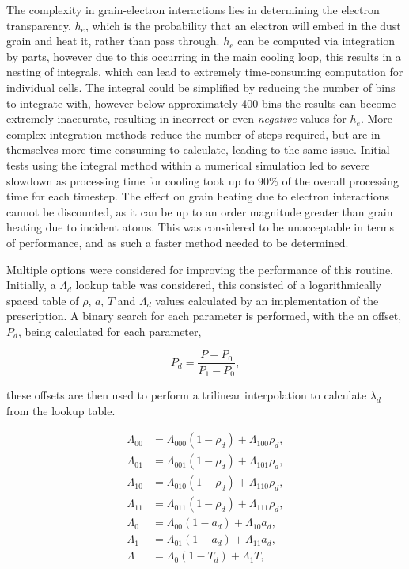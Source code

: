 The complexity in grain-electron interactions lies in determining the electron transparency, $h_e$, which is the probability that an electron will embed in the dust grain and heat it, rather than pass through.
$h_e$ can be computed via integration by parts, however due to this occurring in the main cooling loop, this results in a nesting of integrals, which can lead to extremely time-consuming computation for individual cells.
The integral could be simplified by reducing the number of bins to integrate with, however below approximately 400 bins the results can become extremely inaccurate, resulting in incorrect or even \textit{negative} values for $h_e$.
More complex integration methods reduce the number of steps required, but are in themselves more time consuming to calculate, leading to the same issue.
Initial tests using the integral method within a numerical simulation led to severe slowdown as processing time for cooling took up to 90\% of the overall processing time for each timestep.
The effect on grain heating due to electron interactions cannot be discounted, as it can be up to an order magnitude greater than grain heating due to incident atoms.
This was considered to be unacceptable in terms of performance, and as such a faster method needed to be determined.

Multiple options were considered for improving the performance of this routine.
Initially, a $\Lambda_d$ lookup table was considered, this consisted of a logarithmically spaced table of $\rho$, $a$, $T$ and $\Lambda_d$ values calculated by an implementation of the \cite{dwek_infrared_1981} prescription. 
A binary search for each parameter is performed, with the an offset, $P_d$, being calculated for each parameter,

\begin{equation}
  P_{d}=\frac{P-P_{0}}{P_{1}-P_{0}} , 
\end{equation}

\noindent
these offsets are then used to perform a trilinear interpolation to calculate $\lambda_d$ from the lookup table.

\begin{equation}
  \begin{split}
    \Lambda_{00} &=\Lambda_{000}\left(1-\rho_{d}\right)+\Lambda_{100} \rho_{d}, \\
    \Lambda_{01} &=\Lambda_{001}\left(1-\rho_{d}\right)+\Lambda_{101} \rho_{d}, \\
    \Lambda_{10} &=\Lambda_{010}\left(1-\rho_{d}\right)+\Lambda_{110} \rho_{d}, \\
    \Lambda_{11} &=\Lambda_{011}\left(1-\rho_{d}\right)+\Lambda_{111} \rho_{d}, \\
    \Lambda_{0} &=\Lambda_{00}\left(1-a_{d}\right)+\Lambda_{10} a_{d}, \\
    \Lambda_{1} &=\Lambda_{01}\left(1-a_{d}\right)+\Lambda_{11} a_{d}, \\
    \Lambda &=\Lambda_{0}\left(1-T_{d}\right)+\Lambda_{1} T,
  \end{split}
\end{equation}

